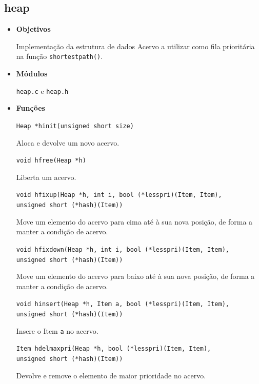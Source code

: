 \documentclass[portuguese, a4paper]{article}
\newcommand\tu[0]{\textunderscore}
\begin{document}
	\subsection{heap}
	\begin{itemize}
		\item \textbf{Objetivos}
		\par
		Implementação da estrutura de dados Acervo a utilizar como fila
		prioritária na função \texttt{shortest\tu path()}.

		\item \textbf{Módulos}
		\par
		\texttt{heap.c} e \texttt{heap.h}

		\item \textbf{Funções}
		\par
		\texttt{Heap *h\tu init(unsigned short size)}
		\par
		Aloca e devolve um novo acervo.

		\par\null\par
		\texttt{void h\tu free(Heap *h)}
		\par
		Liberta um acervo.

		\par\null\par
		\texttt{void h\tu fixup(Heap *h, int i, bool (*less\tu pri)(Item, Item), \\
		unsigned short (*hash)(Item))}
		\par
		Move um elemento do acervo para cima até à sua nova posição, de forma a
		manter a condição de acervo.

		\par\null\par
		\texttt{void h\tu fixdown(Heap *h, int i, bool (*less\tu pri)(Item, Item), \\
		unsigned short (*hash)(Item))}
		\par
		Move um elemento do acervo para baixo até à sua nova posição, de forma a
		manter a condição de acervo.

		\par\null\par
		\texttt{void h\tu insert(Heap *h, Item a, bool (*less\tu pri)(Item, Item), \\
		unsigned short (*hash)(Item))}
		\par
		Insere o Item \texttt{a} no acervo.

		\par\null\par
		\texttt{Item h\tu del\tu max\tu pri(Heap *h, bool (*less\tu pri)(Item, Item), \\
		unsigned short (*hash)(Item))}
		\par
		Devolve e remove o elemento de maior prioridade no acervo.


\end{itemize}
\end{document}
